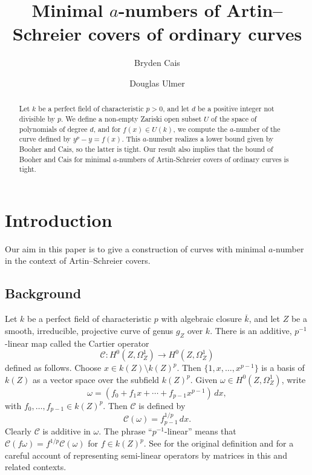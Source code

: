 \documentclass[12pt,reqno]{amsart}
\numberwithin{equation}{section}
\theoremstyle{plain}
\theoremstyle{definition}
\theoremstyle{remark}
\numberwithin{equation}{section}
\newcommand{\CC}{\mathcal{C}}
\newcommand{\kbar}{{\overline{k}}}
\newcommand{\<}{\langle}
\renewcommand{\>}{\rangle}
\begin{document}
\begin{abstract}
  Let $k$ be a perfect field of characteristic $p>0$, and let $d$ be a
  positive integer not divisible by $p$.  We define a non-empty
  Zariski open subset $U$ of the space of polynomials of degree $d$,
  and for $f(x)\in U(k)$, we compute the $a$-number of the curve
  defined by $y^p-y=f(x)$.  This $a$-number realizes a lower bound
  given by Booher and Cais, so the latter is tight.  Our result also
  implies that the bound of Booher and Cais for minimal $a$-numbers of
  Artin-Schreier covers of ordinary curves is tight.
\end{abstract}

\title[Minimal $a$-numbers]{Minimal $a$-numbers of Artin--Schreier
  covers of ordinary curves} 

\author{Bryden Cais}
\address{Department of Mathematics \\ University of Arizona
 \\ Tucson, AZ~~85721 USA}

\author{Douglas Ulmer}
\address{Department of Mathematics \\ University of Arizona
 \\ Tucson, AZ~~85721 USA}


\maketitle

\section{Introduction}
Our aim in this paper is to give a construction of curves with minimal
$a$-number in the context of Artin--Schreier covers.

\subsection{Background}
Let $k$ be a perfect field of characteristic $p$ with algebraic
closure $\kbar$, and let $Z$ be a smooth, irreducible, projective
curve of genus $g_Z$ over $k$.  There is an additive, $p^{-1}$-linear
map called the Cartier operator
\[\CC: H^0(Z,\Omega^1_Z)\to H^0(Z,\Omega^1_Z)\]
defined as follows.  Choose $x\in k(Z)\setminus k(Z)^p$.  Then
$\{1,x,\dots,x^{p-1}\}$ is a basis of $k(Z)$ as a vector space over
the subfield $k(Z)^p$.  Given $\omega\in H^0(Z,\Omega^1_Z)$, write
\[\omega=\left(f_0+f_1x+\cdots+f_{p-1}x^{p-1}\right)\,dx,\]
with $f_0,\dots,f_{p-1}\in k(Z)^p$.  Then $\CC$ is defined by
\[\CC(\omega)=f_{p-1}^{1/p}\,dx.\]
Clearly $\CC$ is additive in $\omega$.  The phrase ``$p^{-1}$-linear''
means that $\CC(f\omega)=f^{1/p}\CC(\omega)$ for $f\in k(Z)^p$.  See
\cite{Cartier57} for the original definition and \cite{AchterHowe19}
for a careful account of representing semi-linear operators by
matrices in this and related contexts.
\end{document}
